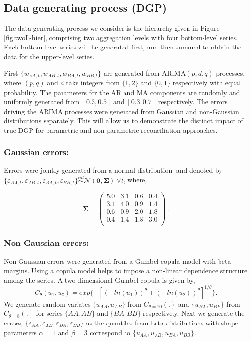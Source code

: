 \documentclass[12pt]{article}
\theoremstyle{definition}
\begin{document}
\subsection{Data generating process (DGP)} \label{subsec:DGP}

The data generating process we consider is the hierarchy given in Figure \ref{fig:twoL-hier}, comprising two aggregation levels with four bottom-level series. Each bottom-level series will be generated first, and then summed to obtain the data for the upper-level series.

First $\{w_{AA,t},w_{AB,t},w_{BA,t},w_{BB,t}\}$ are generated from ARIMA$(p,d,q)$ processes, where $(p,q)$ and $d$ take integers from $\{1,2\}$ and $\{0,1\}$ respectively with equal probability. The parameters for the AR and MA components are randomly and uniformly generated from $[0.3,0.5]$ and $[0.3,0.7]$ respectively.
The errors driving the ARIMA processes were generated from Gaussian and non-Gaussian distributions separately. This will allow us to demonstrate the distinct impact of true DGP for parametric and non-parametric reconciliation approaches. 


\subsubsection*{Gaussian errors:}

Errors were jointly generated from a normal distribution, and denoted by $\{\varepsilon_{AA,t},\varepsilon_{AB,t},\varepsilon_{BA,t},\varepsilon_{BB,t}\} \overset{iid}{\sim} \mathcal{N}(\bm{0}, \bm{\Sigma})~\forall t$, where,


\begin{equation}\label{eq:SigmaGaussian}
\bm{\Sigma} =
\begin{pmatrix}
5.0 & 3.1 & 0.6 & 0.4 \\
3.1 & 4.0 & 0.9 & 1.4 \\
0.6 & 0.9 & 2.0 & 1.8 \\
0.4 & 1.4 & 1.8 & 3.0 \\
\end{pmatrix}\,.
\end{equation}


\subsubsection*{Non-Gaussian errors:}

Non-Gaussian errors were generated from a Gumbel copula model with beta margins. Using a copula model helps to impose a non-linear dependence structure among the series. A two dimensional Gumbel copula is given by,
\begin{equation*}
C_\theta(u_1, u_2) = exp\{-[(-ln(u_1))^\theta + (-ln(u_2))^\theta]^{1/\theta}\}.
\end{equation*}
We generate random variates $\{u_{AA}, u_{AB}\}$ from $C_{\theta=10}(.)$ and $\{u_{BA}, u_{BB}\}$ from $C_{\theta=8}(.)$ for series $\{AA, AB\}$ and $\{BA, BB\}$ respectively. Next we generate the errors, $\{\varepsilon_{AA}, \varepsilon_{AB}, \varepsilon_{BA}, \varepsilon_{BB}\}$ as the quantiles from beta distributions with shape parameters $\alpha = 1$ and $\beta = 3$ correspond to $\{u_{AA}, u_{AB}, u_{BA}, u_{BB}\}$.
\end{document}
